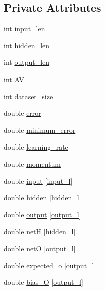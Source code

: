 \subsection*{Private Attributes}
\begin{DoxyCompactItemize}
\item 
int \hyperlink{a00003_a9e5319bf385fa55bbbd8f0160915306d}{input\-\_\-len}
\item 
int \hyperlink{a00003_a71cc8ca03da47fe639dd1e8ed518069c}{hidden\-\_\-len}
\item 
int \hyperlink{a00003_a053d2b510e07b1f25ef112f366bc62ba}{output\-\_\-len}
\item 
int \hyperlink{a00003_a970136042929b26220d35be2776220a6}{A\-V}
\item 
int \hyperlink{a00003_a8fe39196b36a38696abd679328dd8232}{dataset\-\_\-size}
\item 
double \hyperlink{a00003_a2ffe42aee798e268d4bbf0f3428ba430}{error}
\item 
double \hyperlink{a00003_aa2898d2ec7ac091b6d40916d4b113a93}{minimum\-\_\-error}
\item 
double \hyperlink{a00003_a1994986029a1ef9d55fa4bb1b440210b}{learning\-\_\-rate}
\item 
double \hyperlink{a00003_a3a3ea713384da26e538bc60da8410a75}{momentum}
\item 
double \hyperlink{a00003_a347a1fceb1ac048ecd913a89126cebb3}{input} \mbox{[}\hyperlink{a00008_a8dae3b2c955083e02ba56da92adbf25d}{input\-\_\-l}\mbox{]}
\item 
double \hyperlink{a00003_a5b31deacdc5c63e687d6ebc086b761ab}{hidden} \mbox{[}\hyperlink{a00008_aa7fdf42e8c0a65ea15cb37a990708e36}{hidden\-\_\-l}\mbox{]}
\item 
double \hyperlink{a00003_abe5631cce6141b7756154a5a9d247da2}{output} \mbox{[}\hyperlink{a00008_a0a0ddfc9fb3bc3d90d175ed1f7bd54c5}{output\-\_\-l}\mbox{]}
\item 
double \hyperlink{a00003_aa07e5b1f8997f895d7550495a5b4f0d2}{net\-H} \mbox{[}\hyperlink{a00008_aa7fdf42e8c0a65ea15cb37a990708e36}{hidden\-\_\-l}\mbox{]}
\item 
double \hyperlink{a00003_a8bcf19afde3c08afbd862759c839a769}{net\-O} \mbox{[}\hyperlink{a00008_a0a0ddfc9fb3bc3d90d175ed1f7bd54c5}{output\-\_\-l}\mbox{]}
\item 
double \hyperlink{a00003_a8d632cf69d2fcd076e473aba1ae74702}{expected\-\_\-o} \mbox{[}\hyperlink{a00008_a0a0ddfc9fb3bc3d90d175ed1f7bd54c5}{output\-\_\-l}\mbox{]}
\item 
double \hyperlink{a00003_a8f26363ac0ccda6f04df35e68164cd3a}{bias\-\_\-\-O} \mbox{[}\hyperlink{a00008_a0a0ddfc9fb3bc3d90d175ed1f7bd54c5}{output\-\_\-l}\mbox{]}

\end{DoxyCompactItemize}
